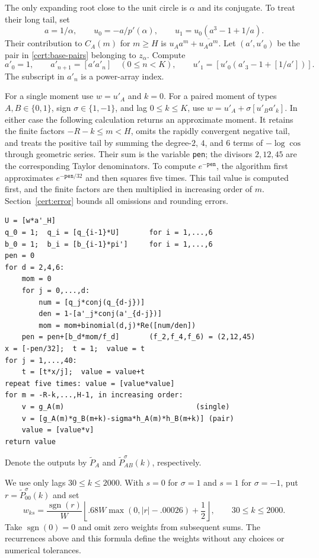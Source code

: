 The only expanding root close to the unit circle is $\alpha$ and its
conjugate.  To treat their long tail, set
\begin{equation}\label{cert:weak-coefficients}
 a=1/\alpha,\qquad u_0=-a/p'(\alpha),\qquad
 u_1=u_0(a^3-1+1/a).
\end{equation}
Their contribution to $C_A(m)$ for $m\ge H$ is
$u_Aa^m+\overline{u_Aa^m}$.  Let $(a',u'_0)$ be the pair in
\eqref{cert:base-pairs} belonging to $z_\alpha$.  Compute
\[
 a'_0=1,\qquad a'_{n+1}=[a'a'_n]\quad(0\le n<K),\qquad
 u'_1=[u'_0(a'_3-1+[1/a'])].
\]
The subscript in $a'_n$ is a power-array index.

For a single moment use $w=u'_A$ and $k=0$.  For a paired moment
of types $A,B\in\{0,1\}$, sign $\sigma\in\{1,-1\}$, and lag
$0\le k\le K$, use
$w=u'_A+\sigma[u'_Ba'_k]$.  In either case the following calculation
returns an approximate moment.  It retains the finite factors
$-R-k\le m<H$, omits the rapidly convergent negative tail, and treats
the positive tail by summing the degree-$2$, $4$, and $6$ terms of
$-\log\cos$ through geometric series.  Their sum is the variable
\texttt{pen}; the divisors $2,12,45$ are the corresponding Taylor
denominators.  To compute $e^{-\texttt{pen}}$, the algorithm first
approximates $e^{-\texttt{pen}/32}$ and then squares five times.
This tail value is computed first, and the finite factors are then
multiplied in increasing order of $m$.  Section~\ref{cert:error}
bounds all omissions and rounding errors.
\begin{verbatim}
U = [w*a'_H]
q_0 = 1;  q_i = [q_{i-1}*U]       for i = 1,...,6
b_0 = 1;  b_i = [b_{i-1}*pi']     for i = 1,...,6
pen = 0
for d = 2,4,6:
    mom = 0
    for j = 0,...,d:
        num = [q_j*conj(q_{d-j})]
        den = 1-[a'_j*conj(a'_{d-j})]
        mom = mom+binomial(d,j)*Re([num/den])
    pen = pen+[b_d*mom/f_d]       (f_2,f_4,f_6) = (2,12,45)
x = [-pen/32];  t = 1;  value = t
for j = 1,...,40:
    t = [t*x/j];  value = value+t
repeat five times: value = [value*value]
for m = -R-k,...,H-1, in increasing order:
    v = g_A(m)                               (single)
    v = [g_A(m)*g_B(m+k)-sigma*h_A(m)*h_B(m+k)] (pair)
    value = [value*v]
return value
\end{verbatim}
Denote the outputs by $\widetilde P_A$ and
$\widetilde P_{AB}^{\sigma}(k)$, respectively.

We use only lags $30\le k\le2000$.  With $s=0$ for $\sigma=1$ and $s=1$ for
$\sigma=-1$, put $r=\widetilde P_{00}^{\sigma}(k)$ and set
\begin{equation}\label{cert:weights}
 w_{ks}=\frac{\operatorname{sgn}(r)}{W}
 \left\lfloor .68W\max(0,|r|-.00026)+\frac12\right\rfloor,
 \qquad 30\le k\le2000.
\end{equation}
Take $\operatorname{sgn}(0)=0$ and omit zero weights from subsequent
sums.  The recurrences above and this formula define the weights
without any choices or numerical tolerances.

